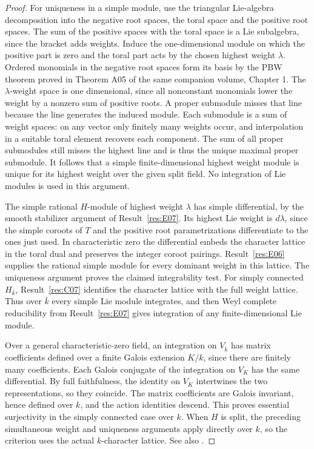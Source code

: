 \documentclass[11pt,a4paper,openany,oneside]{book}
\theoremstyle{resultstyle}
\theoremstyle{definition}
\numberwithin{equation}{chapter}
\begin{document}
\begin{proof}
For uniqueness in a simple module, use the triangular
Lie-algebra decomposition into the negative root spaces, the
toral space and the positive root spaces. The sum of the positive
spaces with the toral space is a Lie subalgebra, since the
bracket adds weights. Induce the one-dimensional module on
which the positive part is zero and the toral part acts by
the chosen highest weight \(\lambda\). Ordered monomials
in the negative root spaces form its basis by the PBW theorem
proved in Theorem A05 of the same companion volume, Chapter 1.
The \(\lambda\)-weight space is one dimensional, since all
nonconstant monomials lower the weight by a nonzero sum of
positive roots. A proper submodule misses that line because
the line generates the induced module. Each submodule is a sum
of weight spaces: on any vector only finitely many weights
occur, and interpolation in a suitable toral element recovers
each component. The sum of all proper submodules still misses the
highest line and is thus the unique maximal proper submodule.
It follows that a simple finite-dimensional highest weight
module is unique for its highest weight over the given split
field. No integration of Lie modules is used in this argument.

The simple rational \(H\)-module of highest weight \(\lambda\)
has simple differential, by the smooth stabilizer argument
of Result~\ref{res:E07}. Its highest Lie weight is \(d\lambda\),
since the simple coroots of \(T\) and the positive root
parametrizations differentiate to the ones just used. In
characteristic zero the differential embeds the character
lattice in the toral dual and preserves the integer coroot
pairings. Result~\ref{res:E06} supplies the rational simple
module for every dominant weight in this lattice. The uniqueness
argument proves the claimed integrability test. For simply
connected \(H_{\bar k}\), Result~\ref{res:C07} identifies
the character lattice with the full weight lattice. Thus
over \(\bar k\) every simple Lie module integrates, and then
Weyl complete reducibility from Result~\ref{res:E07} gives
integration of any finite-dimensional Lie module.

Over a general characteristic-zero field, an integration on \(V_{\overline k}\) has matrix coefficients defined over a finite Galois extension \(K/k\), since there are finitely many coefficients. Each Galois conjugate of the integration on \(V_K\) has the same differential. By full faithfulness, the identity on \(V_K\) intertwines the two representations, so they coincide. The matrix coefficients are Galois invariant, hence defined over \(k\), and the action identities descend. This proves essential surjectivity in the simply connected case
over \(k\). When \(H\) is split, the preceding simultaneous weight
and uniqueness arguments apply directly over \(k\), so the
criterion uses the actual \(k\)-character lattice. See also
\cite[22.12 and Theorem~22.53]{milne}.


\end{proof}
\end{document}
